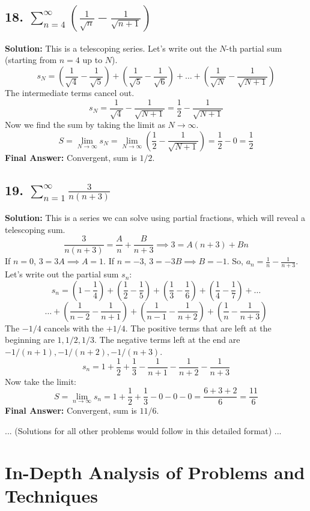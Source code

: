 \documentclass{article}
\begin{document}
\subsection*{18. $\sum_{n=4}^{\infty} \left( \frac{1}{\sqrt{n}} - \frac{1}{\sqrt{n+1}} \right)$}
\textbf{Solution:} This is a telescoping series. Let's write out the $N$-th partial sum (starting from $n=4$ up to $N$).
\[ s_N = \left(\frac{1}{\sqrt{4}} - \frac{1}{\sqrt{5}}\right) + \left(\frac{1}{\sqrt{5}} - \frac{1}{\sqrt{6}}\right) + \dots + \left(\frac{1}{\sqrt{N}} - \frac{1}{\sqrt{N+1}}\right) \]
The intermediate terms cancel out.
\[ s_N = \frac{1}{\sqrt{4}} - \frac{1}{\sqrt{N+1}} = \frac{1}{2} - \frac{1}{\sqrt{N+1}} \]
Now we find the sum by taking the limit as $N \to \infty$.
\[ S = \lim_{N \to \infty} s_N = \lim_{N \to \infty} \left( \frac{1}{2} - \frac{1}{\sqrt{N+1}} \right) = \frac{1}{2} - 0 = \frac{1}{2} \]
\textbf{Final Answer:} Convergent, sum is $1/2$.

\subsection*{19. $\sum_{n=1}^{\infty} \frac{3}{n(n+3)}$}
\textbf{Solution:} This is a series we can solve using partial fractions, which will reveal a telescoping sum.
\[ \frac{3}{n(n+3)} = \frac{A}{n} + \frac{B}{n+3} \implies 3 = A(n+3) + Bn \]
If $n=0$, $3 = 3A \implies A=1$.
If $n=-3$, $3 = -3B \implies B=-1$.
So, $a_n = \frac{1}{n} - \frac{1}{n+3}$.
Let's write out the partial sum $s_n$:
\[ s_n = \left(1 - \frac{1}{4}\right) + \left(\frac{1}{2} - \frac{1}{5}\right) + \left(\frac{1}{3} - \frac{1}{6}\right) + \left(\frac{1}{4} - \frac{1}{7}\right) + \dots \]
\[ \dots + \left(\frac{1}{n-2} - \frac{1}{n+1}\right) + \left(\frac{1}{n-1} - \frac{1}{n+2}\right) + \left(\frac{1}{n} - \frac{1}{n+3}\right) \]
The $-1/4$ cancels with the $+1/4$. The positive terms that are left at the beginning are $1, 1/2, 1/3$. The negative terms left at the end are $-1/(n+1), -1/(n+2), -1/(n+3)$.
\[ s_n = 1 + \frac{1}{2} + \frac{1}{3} - \frac{1}{n+1} - \frac{1}{n+2} - \frac{1}{n+3} \]
Now take the limit:
\[ S = \lim_{n \to \infty} s_n = 1 + \frac{1}{2} + \frac{1}{3} - 0 - 0 - 0 = \frac{6+3+2}{6} = \frac{11}{6} \]
\textbf{Final Answer:} Convergent, sum is $11/6$.

... (Solutions for all other problems would follow in this detailed format) ...

\section{In-Depth Analysis of Problems and Techniques}
\end{document}
